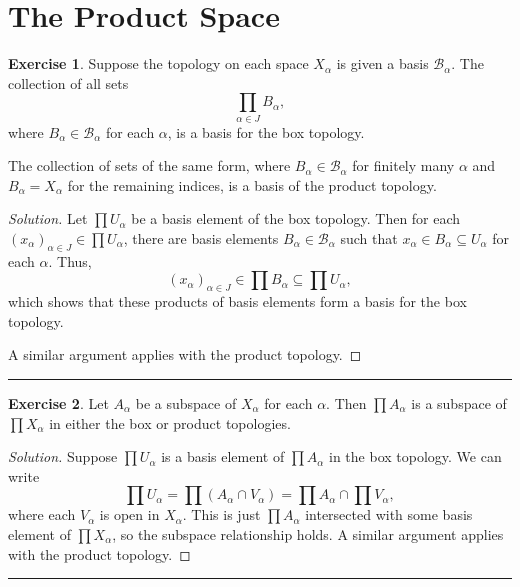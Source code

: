 \documentclass{article}
\theoremstyle{definition}
\newtheorem{exercise}{Exercise}[section]
\begin{document}
\addtocounter{section}{18}
\section{The Product Space}

\begin{exercise}
  Suppose the topology on each space $X_\alpha$ is given a basis $\mathcal{B}_\alpha$. The collection of all sets $$\prod_{\alpha\in J} B_\alpha,$$
  where $B_\alpha\in\mathcal{B}_\alpha$ for each $\alpha$, is a basis for the box topology.

  The collection of sets of the same form, where $B_\alpha\in\mathcal{B}_\alpha$ for finitely many $\alpha$ and $B_\alpha = X_\alpha$ for the remaining indices, is a basis of the product topology.
\end{exercise}
\begin{proof}[Solution]
  Let $\prod U_\alpha$ be a basis element of the box topology. Then for each $(x_\alpha)_{\alpha\in J}\in\prod U_\alpha$, there are basis elements $B_\alpha\in\mathcal{B}_\alpha$ such that $x_\alpha\in B_\alpha\subseteq U_\alpha$ for each $\alpha$. Thus,
  $$(x_\alpha)_{\alpha\in J}\in\prod B_\alpha \subseteq\prod U_\alpha,$$
  which shows that these products of basis elements form a basis for the box topology.

  A similar argument applies with the product topology.
\end{proof}

\hrule

\begin{exercise}
  Let $A_\alpha$ be a subspace of $X_\alpha$ for each $\alpha$. Then $\prod A_\alpha$ is a subspace of $\prod X_\alpha$ in either the box or product topologies.
\end{exercise}
\begin{proof}[Solution]
  Suppose $\prod U_\alpha$ is a basis element of $\prod A_\alpha$ in the box topology. We can write
  $$\prod U_\alpha = \prod (A_\alpha\cap V_\alpha) = \prod A_\alpha \cap \prod V_\alpha,$$
  where each $V_\alpha$ is open in $X_\alpha$. This is just $\prod A_\alpha$ intersected with some basis element of $\prod X_\alpha$, so the subspace relationship holds. A similar argument applies with the product topology.
\end{proof}

\hrule
\end{document}
